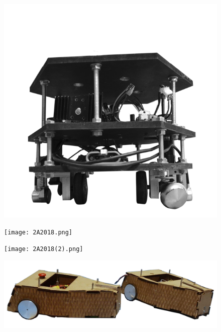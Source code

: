 \documentclass[a4paper,10pt]{article}
\begin{document}
\begin{spacing}{1.5}
\begin{multicols}{2}
\begin{figure}[H]
    \includegraphics[scale=0.3]{1A2018(2).png}
  \end{figure}
\end{multicols}

\begin{multicols}{2}
  \begin{figure}[H]
    \center
    \texttt{[image: 2A2018.png]}
  \end{figure}
  \columnbreak
  \begin{figure}[H]
    \center
    \texttt{[image: 2A2018(2).png]}
  \end{figure}
\end{multicols}

  \begin{figure}[H]
    \center
    \includegraphics[scale=0.45]{brenda.png}
  \end{figure}


\end{spacing}
\end{document}

